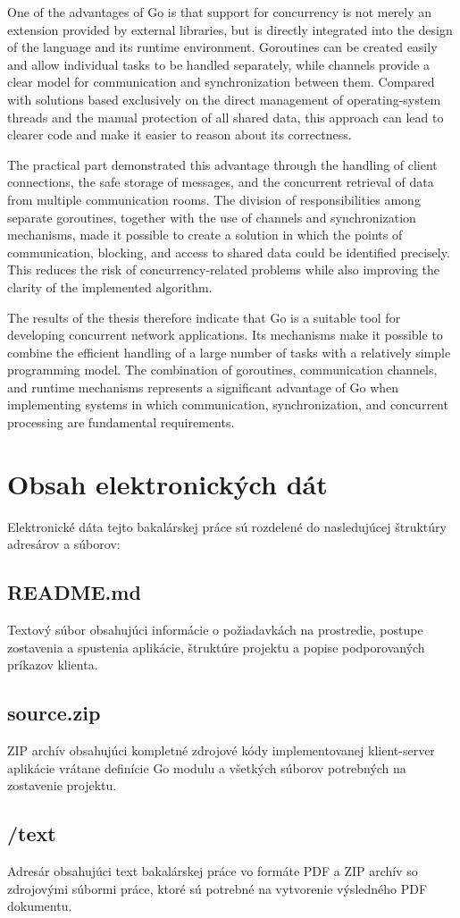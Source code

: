 \documentclass[
  biblatex,
  seconds=true,
  language=slovak,
  figures=false,
  urldate=iso,
  glossaries,
  index
]{kidiplom}
\begin{document}
One of the advantages of Go is that support for concurrency is not merely an extension provided by external libraries, but is directly integrated into the design of the language and its runtime environment. Goroutines can be created easily and allow individual tasks to be handled separately, while channels provide a clear model for communication and synchronization between them. Compared with solutions based exclusively on the direct management of operating-system threads and the manual protection of all shared data, this approach can lead to clearer code and make it easier to reason about its correctness.

The practical part demonstrated this advantage through the handling of client connections, the safe storage of messages, and the concurrent retrieval of data from multiple communication rooms. The division of responsibilities among separate goroutines, together with the use of channels and synchronization mechanisms, made it possible to create a solution in which the points of communication, blocking, and access to shared data could be identified precisely. This reduces the risk of concurrency-related problems while also improving the clarity of the implemented algorithm.

The results of the thesis therefore indicate that Go is a suitable tool for developing concurrent network applications. Its mechanisms make it possible to combine the efficient handling of a large number of tasks with a relatively simple programming model. The combination of goroutines, communication channels, and runtime mechanisms represents a significant advantage of Go when implementing systems in which communication, synchronization, and concurrent processing are fundamental requirements.

\appendix
\section{Obsah elektronických dát}
Elektronické dáta tejto bakalárskej práce sú rozdelené do nasledujúcej štruktúry adresárov a súborov:

\subsection*{README.md}
Textový súbor obsahujúci informácie o požiadavkách na prostredie, postupe zostavenia a spustenia aplikácie, štruktúre projektu a popise podporovaných príkazov klienta.

\subsection*{source.zip}
ZIP archív obsahujúci kompletné zdrojové kódy implementovanej klient-server aplikácie vrátane definície Go modulu a všetkých súborov potrebných na zostavenie projektu.

\subsection*{/text}
Adresár obsahujúci text bakalárskej práce vo formáte PDF a ZIP archív so zdrojovými súbormi práce, ktoré sú potrebné na vytvorenie výsledného PDF dokumentu.
\nocite{*}
\printbibliography
\end{document}
